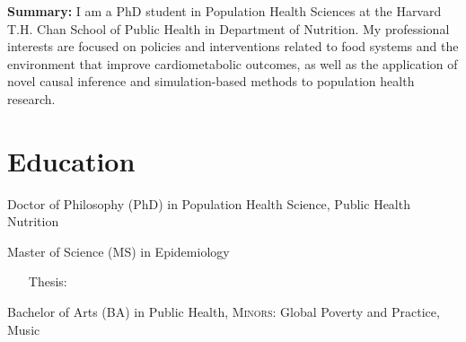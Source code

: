 \documentclass{cv_style}
\begin{document}
\begin{center}
\end{center}


\begin{adjustwidth}{0.7cm}{0.7cm} \parskip 8pt \begin{small} \textbf{Summary:} I am a PhD student in Population Health Sciences at the Harvard T.H. Chan School of Public Health in Department of Nutrition. My professional interests are focused on policies and interventions related to food systems and the environment that improve cardiometabolic outcomes, as well as the application of novel causal inference and simulation-based methods to population health research. 
\end{small}
\end{adjustwidth}


\parskip -5pt 
\section{Education}
\parskip -5pt
\parskip -4pt \noindent Doctor of Philosophy (PhD) in Population Health Science, Public Health Nutrition

\parskip -4pt Master of Science (MS) in Epidemiology \\
    \vspace{-1em}
    \begingroup
    \addtolength{\leftmargini}{3em} \begin{itemize}
        \item[\hspace{1em}Thesis:] 
    \end{itemize}
    \endgroup
\parskip -8pt  

\parskip -4pt \noindent  Bachelor of Arts (BA) in Public Health, \textsc{Minors:} Global Poverty and Practice, Music
\end{document}
